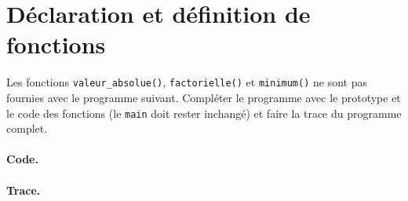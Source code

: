 \section{Déclaration et définition de fonctions}

Les fonctions \verb+valeur_absolue()+, \verb+factorielle()+ et
\verb+minimum()+ ne sont pas fournies avec le programme
suivant. Compléter le programme avec le prototype et le code des
fonctions (le \verb+main+ doit rester inchangé) et
faire la trace du programme complet.

{\footnotesize
{}
}

\begin{correction}

\paragraph{Code.}

{\footnotesize
{}
}


  \paragraph{Trace.}


\end{correction}
